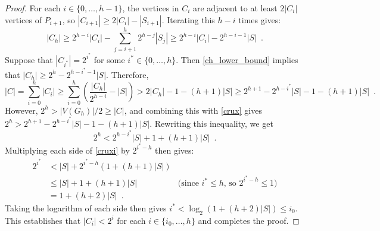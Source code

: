 \documentclass{patmorin}
\newcommand\numberthis{\addtocounter{equation}{1}\tag{\theequation}}
\renewcommand{\le}{\leqslant}
\renewcommand{\ge}{\geqslant}
\begin{document}
\begin{proof}
  For each $i\in\{0,\ldots,h-1\}$, the vertices in $C_i$ are adjacent to at least $2|C_i|$ vertices of $P_{i+1}$, so $|C_{i+1}|\ge 2|C_i|-|S_{i+1}|$.  Iterating this $h-i$ times gives:
  \begin{equation}
    |C_h| \ge 2^{h-i}|C_i| - \sum_{j=i+1}^h 2^{h-j}|S_j| \ge 2^{h-i}|C_i| - 2^{h-i-1}|S| \enspace . \label{ch_lower_bound}
  \end{equation}
  Suppose that $|C_{i^*}|=2^{i^*}$ for some $i^*\in\{0,\ldots,h\}$. Then \cref{ch_lower_bound} implies that $|C_h|\ge 2^h-2^{h-i^*-1}|S|$.  Therefore,
  \begin{equation}
      |C|
         =\sum_{i=0}^h |C_i| \ge \sum_{i=0}^h\left(\frac{|C_h|}{2^{h-i}} - |S|\right)
       > 2|C_h| - 1 -(h+1)|S|
       \ge 2^{h+1}-2^{h-i^*}|S|-1 - (h+1)|S| \enspace .  \label{crux}
  \end{equation}
  However, $2^h > |V(G_h)|/2 \ge |C|$, and combining this with \cref{crux} gives $2^h > 2^{h+1} - 2^{h-i^*}|S|-1-(h+1)|S|$.
  Rewriting this inequality, we get
  \begin{equation}
     2^h < 2^{h-i^*}|S|+ 1 + (h+1)|S| \enspace . \label{cruxi}
  \end{equation}
  Multiplying each side of \cref{cruxi} by $2^{i^*-h}$ then gives:
  \begin{align*}
    2^{i^*} & <  |S| + 2^{i^*-h}(1+(h+1)|S|) \\
            & \le |S| + 1 + (h+1)|S| & \text{(since $i^*\le h$, so $2^{i^*-h}\le 1$)} \\
            & = 1+ (h+2)|S| \enspace .
  \end{align*}
  Taking the logarithm of each side then gives $i^* < \log_2(1+(h+2)|S|)\le i_0$.  This establishes that $|C_i|< 2^i$ for each $i\in\{i_0,\ldots,h\}$ and  completes the proof.

\end{proof}
\end{document}
